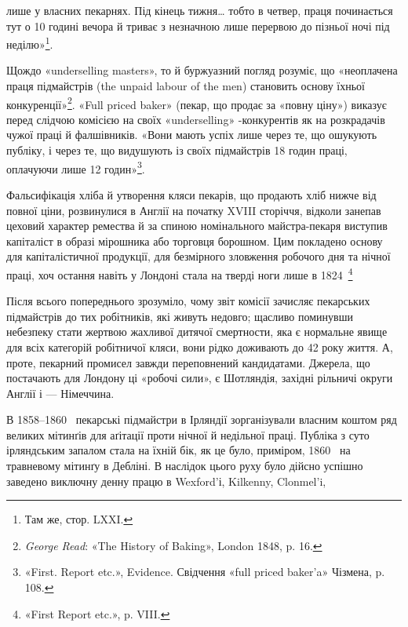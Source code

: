 \parcont{}  %
лише у власних пекарнях. Під кінець тижня\dots{} тобто в четвер,
праця починається тут о 10 годині вечора й триває з незначною
лише перервою до пізньої ночі під неділю»\footnote{
Там же, стор. LXXI.
}.

Щождо «underselling masters», то й буржуазний погляд розуміє,
що «неоплачена праця підмайстрів (the unpaid labour of
the men) становить основу їхньої конкуренції»\footnote{
\emph{George Read}: «The History of Baking», London 1848, p. 16.
}. «Full priced
baker» (пекар, що продає за «повну ціну») виказує перед слідчою
комісією на своїх «underselling» -конкурентів як на розкрадачів
чужої праці й фалшівників. «Вони мають успіх лише
через те, що ошукують публіку, і через те, що видушують із
своїх підмайстрів 18 годин праці, оплачуючи лише 12 годин»\footnote{
«First. Report etc.», Evidence. Свідчення «full priced baker’a» Чізмена,
p. 108.
}.

Фальсифікація хліба й утворення кляси пекарів, що продають
хліб нижче від повної ціни, розвинулися в Англії на початку
XVIII сторіччя, відколи занепав цеховий характер ремества й
за спиною номінального майстра-пекаря виступив капіталіст в образі мірошника або торговця борошном. Цим покладено основу
для капіталістичної продукції, для безмірного зловження робочого
дня та нічної праці, хоч остання навіть у Лондоні стала на тверді
ноги лише в 1824~\footnote{«First Report etc.», p. VIII.}

Після всього попереднього зрозуміло, чому звіт комісії зачисляє
пекарських підмайстрів до тих робітників, які живуть
недовго; щасливо поминувши небезпеку стати жертвою жахливої
дитячої смертности, яка є нормальне явище для всіх категорій
робітничої кляси, вони рідко доживають до 42 року життя. А, проте,
пекарний промисел завжди переповнений кандидатами. Джерела,
що постачають для Лондону ці «робочі сили», є Шотляндія, західні
рільничі округи Англії і — Німеччина.

В 1858--1860~ пекарські підмайстри в Ірляндії зорганізували
власним коштом ряд великих мітинґів для аґітації проти
нічної й недільної праці. Публіка з суто ірляндським запалом
стала на їхній бік, як це було, приміром, 1860~ на травневому
мітинґу в Дебліні. В наслідок цього руху було дійсно успішно
заведено виключну денну працю в Wexford’і, Kilkenny, Clonmel’i,
\parbreak{}  %
